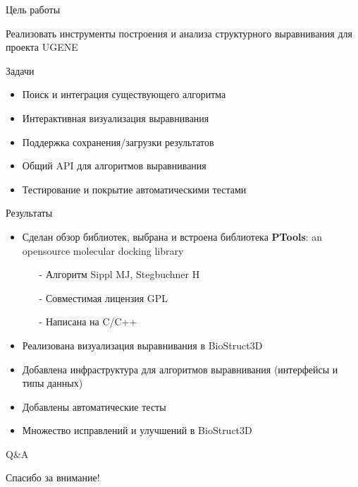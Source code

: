 \documentclass[utf8, professionalfonts]{beamer}
\begin{document}
\begin{frame}{Цель работы}
\begin{center}
\Large Реализовать инструменты построения и анализа структурного выравнивания для проекта UGENE
\end{center}
\vspace{11pt}
Задачи
\begin{itemize}
	\item Поиск и интеграция существующего алгоритма 
	\item Интерактивная визуализация выравнивания
	\item Поддержка сохранения/загрузки результатов 
	\item Общий API для алгоритмов выравнивания
	\item Тестирование и покрытие автоматическими тестами
\end{itemize}
\end{frame}

\begin{frame}{Результаты}
\begin{itemize}
	\item Сделан обзор библиотек, выбрана и встроена библиотека {\bf PTools}: an opensource molecular docking library
		\begin{itemize}
			\item[-] Алгоритм Sippl MJ, Stegbuchner H 
			\item[-] Совместимая лицензия GPL
			\item[-] Написана на C/C++
		\end{itemize}
	\item Реализована визуализация выравнивания в BioStruct3D
	\item Добавлена инфраструктура для алгоритмов выравнивания (интерфейсы и типы данных)
	\item Добавлены автоматические тесты
	\item Множество исправлений и улучшений в BioStruct3D

\end{itemize}
\end{frame}


\begin{frame}{Q\&A}
\begin{center} 
\LARGE{Спасибо за внимание!}
\end{center}
\end{frame}
\end{document}
